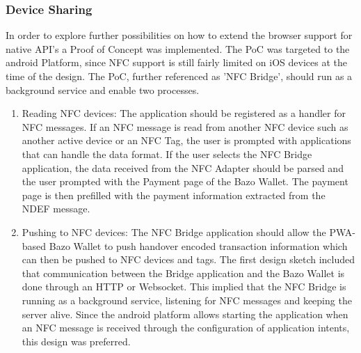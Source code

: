 \documentclass[a4paper]{article}
\begin{document}
\subsubsection{Device Sharing}
In order to explore further possibilities on how to extend the browser support for native API's a Proof of Concept was implemented. The PoC was targeted to the android Platform, since NFC support is still fairly limited on iOS devices at the time of the design. The PoC, further referenced as 'NFC Bridge', should run as a background service and enable two processes.
\begin{enumerate}
\item Reading NFC devices:
The application should be registered as a handler for NFC messages. If an NFC message is read from another NFC device such as another active device or an NFC Tag, the user is prompted with applications that can handle the data format. If the user selects the NFC Bridge application, the data received from the NFC Adapter should be parsed and the user prompted with the Payment page of the Bazo Wallet. The payment page is then prefilled with the payment information extracted from the NDEF message.
\item Pushing to NFC devices: The NFC Bridge application should allow the PWA-based Bazo Wallet to push handover encoded transaction information which can then be pushed to NFC devices and tags.
The first design sketch included that communication between the Bridge application and the Bazo Wallet is done through an HTTP or Websocket. This implied that the NFC Bridge is running as a background service, listening for NFC messages and keeping the server alive.
Since the android platform allows starting the application when an NFC message is received through the configuration of application intents, this design was preferred.
\end{enumerate}
\end{document}
